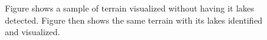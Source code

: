 \begin{figure}[ht]
\centering

  \caption{Figure  shows a sample of terrain visualized without having it lakes detected. Figure  then shows the same terrain with its lakes identified and visualized.}
\label{fig:terrain_lake_example}
\end{figure}

